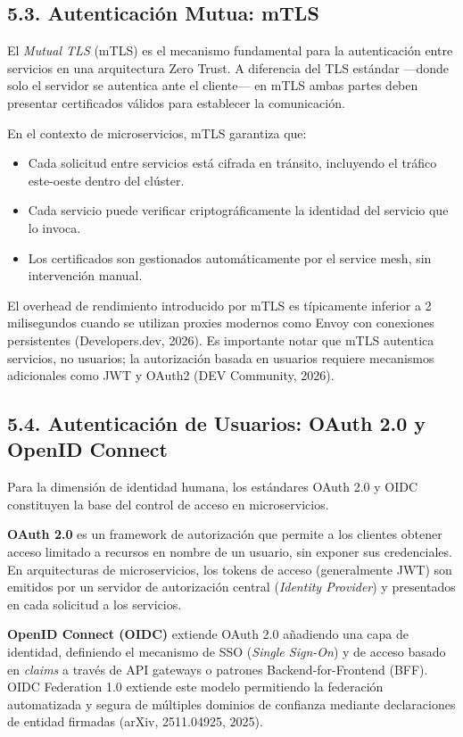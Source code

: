 \documentclass[12pt,a4paper]{article}
\begin{document}
\subsection{5.3. Autenticación Mutua: mTLS}

El \textit{Mutual TLS} (mTLS) es el mecanismo fundamental para la autenticación entre servicios en una arquitectura Zero Trust. A diferencia del TLS estándar —donde solo el servidor se autentica ante el cliente— en mTLS ambas partes deben presentar certificados válidos para establecer la comunicación.

En el contexto de microservicios, mTLS garantiza que:

\begin{itemize}
  \item Cada solicitud entre servicios está cifrada en tránsito, incluyendo el tráfico este-oeste dentro del clúster.
  \item Cada servicio puede verificar criptográficamente la identidad del servicio que lo invoca.
  \item Los certificados son gestionados automáticamente por el service mesh, sin intervención manual.
\end{itemize}

El overhead de rendimiento introducido por mTLS es típicamente inferior a 2 milisegundos cuando se utilizan proxies modernos como Envoy con conexiones persistentes (Developers.dev, 2026). Es importante notar que mTLS autentica servicios, no usuarios; la autorización basada en usuarios requiere mecanismos adicionales como JWT y OAuth2 (DEV Community, 2026).

\subsection{5.4. Autenticación de Usuarios: OAuth 2.0 y OpenID Connect}

Para la dimensión de identidad humana, los estándares OAuth 2.0 y OIDC constituyen la base del control de acceso en microservicios.

\textbf{OAuth 2.0} es un framework de autorización que permite a los clientes obtener acceso limitado a recursos en nombre de un usuario, sin exponer sus credenciales. En arquitecturas de microservicios, los tokens de acceso (generalmente JWT) son emitidos por un servidor de autorización central (\textit{Identity Provider}) y presentados en cada solicitud a los servicios.

\textbf{OpenID Connect (OIDC)} extiende OAuth 2.0 añadiendo una capa de identidad, definiendo el mecanismo de SSO (\textit{Single Sign-On}) y de acceso basado en \textit{claims} a través de API gateways o patrones Backend-for-Frontend (BFF). OIDC Federation 1.0 extiende este modelo permitiendo la federación automatizada y segura de múltiples dominios de confianza mediante declaraciones de entidad firmadas (arXiv, 2511.04925, 2025).
\end{document}

